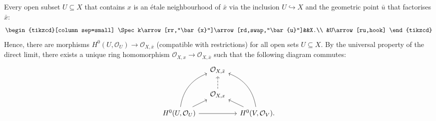 
Every open subset $U\subseteq X$ that contains $x$ is an \'{e}tale neighbourhood of $\bar{x}$ via the inclusion $U\hookrightarrow X$ and the geometric point $\bar{u}$ that factorises $\bar{x}$:
\[
\begin{tikzcd}[column sep=small]
\Spec k\arrow[rr,"\bar{x}"]\arrow[rd,swap,"\bar{u}"]&&X.\\
&U\arrow[ru,hook]
\end{tikzcd}
\]
Hence, there are morphisms $H^0(U,\mathcal{O}_U)\rightarrow\mathcal{O}_{X,\bar{x}}$ (compatible with restrictions) for all open sets $U\subseteq X$. By the universal property of the direct limit, there exists a unique ring homomorphism $\mathcal{O}_{X,x}\rightarrow\mathcal{O}_{X,\bar{x}}$ such that the following diagram commutes:
\[
\begin{tikzcd}[column sep=small,row sep=small]
&\mathcal{O}_{X,\bar{x}}\\\\
&\mathcal{O}_{X,x}\arrow[uu,dashed]\\
H^0(U,\mathcal{O}_U)\arrow[rr]\arrow[ru]\arrow[ruuu,bend left]&&H^0(V,\mathcal{O}_V).\arrow[lu]\arrow[luuu,bend right]
\end{tikzcd}
\]
